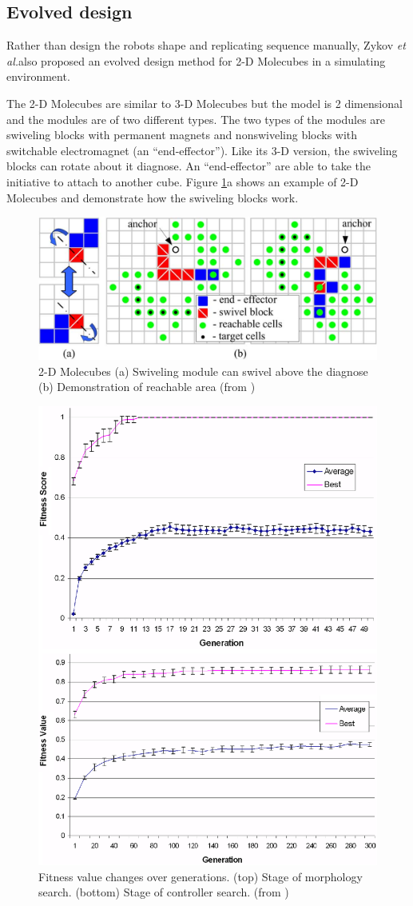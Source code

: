 \documentclass[12pt,twoside]{article}
\theoremstyle{plain}
\theoremstyle{definition}
\theoremstyle{remark}
\newcommand{\etal}{\textit{et al.}}
\begin{document}
\subsection{Evolved design}
Rather than design the robots shape and replicating sequence manually, Zykov \etal also proposed an evolved design method for 2-D Molecubes in a simulating environment\cite{zykov_evolved_2007}.

The 2-D Molecubes are similar to 3-D Molecubes but the model is 2 dimensional and the modules are of two different types. The two types of the modules are swiveling blocks with permanent magnets and nonswiveling blocks with switchable electromagnet (an ``end-effector''). Like its 3-D version, the swiveling blocks can rotate about it diagnose. An ``end-effector'' are able to take the initiative to attach to another cube. Figure \ref{fig:2dmole}a shows an example of 2-D Molecubes and demonstrate how the swiveling blocks work.

\begin{figure}[hbtp]
	 \centerline{\includegraphics[width=.7\textwidth]{zykov-271}}
	 {\caption{2-D Molecubes (a) Swiveling module can swivel above the diagnose (b) Demonstration of reachable area (from \cite{zykov_evolved_2007})}
	 \label{fig:2dmole}}
\end{figure}

\begin{figure}[hbtp]
	 \centerline{\includegraphics[width=.6\textwidth]{zykov-280}}
	 {\caption{Fitness value changes over generations. (top) Stage of morphology search. (bottom) Stage of controller search. (from \cite{zykov_evolved_2007})}
	 \label{fig:fitness}}
\end{figure}
\end{document}
